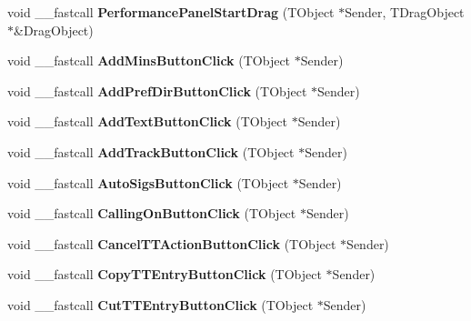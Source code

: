 \begin{DoxyCompactItemize}
void \+\_\+\+\_\+fastcall {\bfseries Performance\+Panel\+Start\+Drag} (T\+Object $\ast$Sender, T\+Drag\+Object $\ast$\&Drag\+Object)
\item 
\mbox{\label{class_t_interface_a30904d608111ce6452a9861d86b64267}} 
void \+\_\+\+\_\+fastcall {\bfseries Add\+Mins\+Button\+Click} (T\+Object $\ast$Sender)
\item 
\mbox{\label{class_t_interface_a1b1a4260e251c9bd5f48fd6c3432e7a5}} 
void \+\_\+\+\_\+fastcall {\bfseries Add\+Pref\+Dir\+Button\+Click} (T\+Object $\ast$Sender)
\item 
\mbox{\label{class_t_interface_aa20c05bf2d6c23035a10a89796334d0f}} 
void \+\_\+\+\_\+fastcall {\bfseries Add\+Text\+Button\+Click} (T\+Object $\ast$Sender)
\item 
\mbox{\label{class_t_interface_a10494e62a7bb4e7114ab4d98e18499f1}} 
void \+\_\+\+\_\+fastcall {\bfseries Add\+Track\+Button\+Click} (T\+Object $\ast$Sender)
\item 
\mbox{\label{class_t_interface_a36ad38f4b485bba874129aeb3a20d926}} 
void \+\_\+\+\_\+fastcall {\bfseries Auto\+Sigs\+Button\+Click} (T\+Object $\ast$Sender)
\item 
\mbox{\label{class_t_interface_ae758bf4183bb5aa2a7cd83e06acd89b6}} 
void \+\_\+\+\_\+fastcall {\bfseries Calling\+On\+Button\+Click} (T\+Object $\ast$Sender)
\item 
\mbox{\label{class_t_interface_af13bf97fa008045dbe3e6a05fbe962e2}} 
void \+\_\+\+\_\+fastcall {\bfseries Cancel\+T\+T\+Action\+Button\+Click} (T\+Object $\ast$Sender)
\item 
\mbox{\label{class_t_interface_adc0dd871fdd70ff11ada7a0ddd549e8e}} 
void \+\_\+\+\_\+fastcall {\bfseries Copy\+T\+T\+Entry\+Button\+Click} (T\+Object $\ast$Sender)
\item 
\mbox{\label{class_t_interface_acd41ae8fa5d16248a867472d9c8ae646}} 
void \+\_\+\+\_\+fastcall {\bfseries Cut\+T\+T\+Entry\+Button\+Click} (T\+Object $\ast$Sender)
\item 

\end{DoxyCompactItemize}
